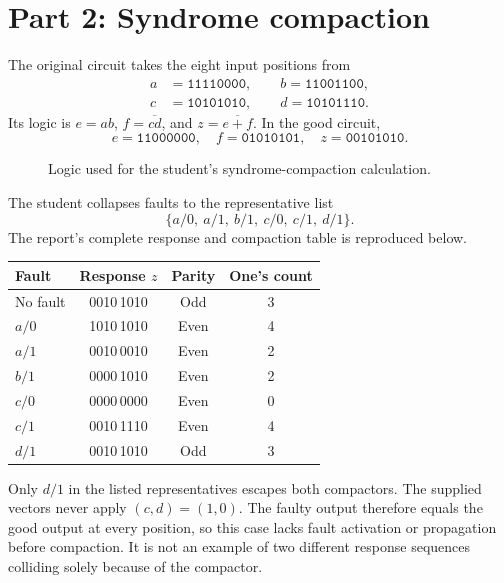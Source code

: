 \documentclass[11pt,a4paper]{article}
\newcommand{\bits}[1]{\texttt{#1}}
\begin{document}
\section{Part 2: Syndrome compaction}
The original circuit takes the eight input positions from
\[
\begin{split}
a&=\bits{11110000},\qquad b=\bits{11001100},\\
c&=\bits{10101010},\qquad d=\bits{10101110}.
\end{split}
\]
Its logic is $e=ab$, $f=\overline{cd}$, and $z=\overline{e+f}$. In the good circuit,
\[
e=\bits{11000000},\quad f=\bits{01010101},\quad z=\bits{00101010}.
\]
\begin{figure}[ht]\centering
{}
\caption{Logic used for the student's syndrome-compaction calculation.}
\end{figure}
The student collapses faults to the representative list
\[
\{a/0,\ a/1,\ b/1,\ c/0,\ c/1,\ d/1\}.
\]
The report's complete response and compaction table is reproduced below.
\begin{center}\small
\begin{tabular}{lccc}
\toprule
Fault & Response $z$ & Parity & One's count\\\midrule
No fault & 0010\,1010 & Odd & 3\\
$a/0$ & 1010\,1010 & Even & 4\\
$a/1$ & 0010\,0010 & Even & 2\\
$b/1$ & 0000\,1010 & Even & 2\\
$c/0$ & 0000\,0000 & Even & 0\\
$c/1$ & 0010\,1110 & Even & 4\\
$d/1$ & 0010\,1010 & Odd & 3\\
\bottomrule
\end{tabular}\end{center}
Only $d/1$ in the listed representatives escapes both compactors. The supplied vectors never apply $(c,d)=(1,0)$. The faulty output therefore equals the good output at every position, so this case lacks fault activation or propagation before compaction. It is not an example of two different response sequences colliding solely because of the compactor.
\end{document}

